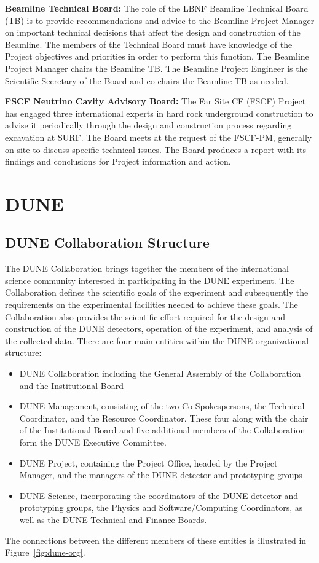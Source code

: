 \textbf{Beamline Technical Board:} The role of the LBNF Beamline Technical Board (TB) is to provide recommendations and advice to the Beamline Project Manager on important technical decisions that affect the design and construction of the Beamline. The members of the Technical Board must have knowledge of the Project objectives and priorities in order to perform this function. The Beamline Project Manager chairs the Beamline TB. The Beamline Project Engineer is the Scientific Secretary of the Board and co-chairs the Beamline TB as needed. 

\textbf{FSCF Neutrino Cavity Advisory Board:} The Far Site CF (FSCF) Project has engaged three international experts in hard rock underground construction to advise it periodically through the design and construction process regarding excavation at SURF. The Board meets at the request of the FSCF-PM, generally on site to discuss specific technical issues. The Board produces a report with its findings and conclusions for Project information and action. 

\section{DUNE}

\subsection{DUNE Collaboration Structure}

The DUNE Collaboration brings together the members of the international science community
interested in participating in the DUNE experiment.  The Collaboration defines the scientific goals of the experiment and subsequently the requirements on the experimental facilities needed to achieve these goals.  The Collaboration also provides the scientific effort required for the design and construction of the DUNE detectors, operation of the experiment, and analysis of the collected data. There are four main entities within the DUNE organizational structure:

\begin{itemize}
\item DUNE Collaboration including the General Assembly of the Collaboration and the Institutional Board \fixme{}
\item DUNE Management, consisting of the two Co-Spokespersons, the Technical Coordinator, and the Resource Coordinator.  These four along with the chair of the Institutional Board and five additional members of the Collaboration form the DUNE Executive Committee.
\item DUNE Project, containing the Project Office, headed by the Project Manager, and the managers of the DUNE detector and prototyping groups 
\item DUNE Science, incorporating the coordinators of the DUNE detector and prototyping groups, the Physics and Software/Computing Coordinators, as well as the DUNE Technical and Finance Boards. 
\end{itemize}
The connections between the different members of these entities is illustrated in Figure~\ref{fig:dune-org}.


